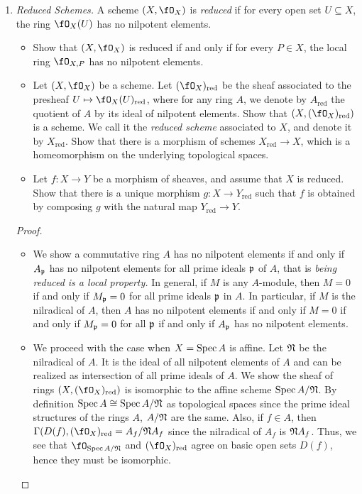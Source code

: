 \documentclass[a4paper]{article}
\begin{document}
\begin{enumerate} [label=\textbf{\arabic*.}, leftmargin=0em]
\item \textit{Reduced Schemes.} A scheme $(X, \fO_X)$ is \textit{reduced} if for every open set $U \subseteq X$, the ring $\fO_X(U)$ has no nilpotent elements.
\begin{itemize}
    \item[(a)] Show that $(X, \fO_X)$ is reduced if and only if for every $P \in X$, the local ring $\fO_{X, P}$ has no nilpotent elements.
    \item[(b)] Let $(X, \fO_X)$ be a scheme. Let $(\fO_X)_\text{red}$ be the sheaf associated to the presheaf $U \mapsto \fO_X(U)_\text{red}$, where for any ring $A$, we denote by $A_\text{red}$ the quotient of $A$ by its ideal of nilpotent elements. Show that $(X, (\fO_X)_\text{red})$ is a scheme. We call it the \textit{reduced scheme} associated to $X$, and denote it by $X_\text{red}$. Show that there is a morphism of schemes $X_\text{red} \to X$, which is a homeomorphism on the underlying topological spaces.
    \item[(c)] Let $f : X \to Y$ be a morphism of sheaves, and assume that $X$ is reduced. Show that there is a unique morphism $g : X \to Y_\text{red}$ such that $f$ is obtained by composing $g$ with the natural map $Y_\text{red} \to Y$.
\end{itemize}

\begin{proof} $ $ \vspace{0pt}
   \begin{itemize} [leftmargin=0cm]
    \item[(a)] We show a commutative ring $A$ has no nilpotent elements if and only if $A_{\mathfrak{p}}$ has no nilpotent elements for all prime ideals $\mathfrak{p}$ of $A$, that is \textit{being reduced is a local property.} In general, if $M$ is any $A$-module, then $M = 0$ if and only if $M_{\mathfrak{p}} = 0$ for all prime ideals $\mathfrak{p}$ in $A$. In particular, if $M$ is the nilradical of $A$, then $A$ has no nilpotent elements if and only if $M = 0$ if and only if $M_{\mathfrak{p}} = 0$ for all $\mathfrak{p}$ if and only if $A_{\mathfrak{p}}$ has no nilpotent elements.

    \item[(b)] We proceed with the case when $X = \operatorname{Spec}{A}$ is affine. Let $\mathfrak{N}$ be the nilradical of $A$. It is the ideal of all nilpotent elements of $A$ and can be realized as intersection of all prime ideals of $A$. We show the sheaf of rings $(X, (\fO_X)_\text{red})$ is isomorphic to the affine scheme $\operatorname{Spec}{A / \mathfrak{N}}$. By definition $\operatorname{Spec}{A} \cong \operatorname{Spec}{A / \mathfrak{N}}$ as topological spaces since the prime ideal structures of the rings $A$, $A / \mathfrak{N}$ are the same. Also, if $f \in A$, then $\Gamma(D(f), (\fO_X)_\text{red} = A_f / \goth{N} A_f$ since the nilradical of $A_f$ is $\mathfrak{N} A_f$. Thus, we see that $\fO_{\spec{A / \goth{N}}}$ and $(\fO_X)_\text{red}$ agree on basic open sets $D(f)$, hence they must be isomorphic.
    

\end{itemize}
\end{proof}
\end{enumerate}
\end{document}
